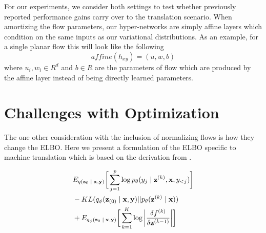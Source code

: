 For our experiments, we consider both settings to test whether previously reported performance gains carry over to the translation scenario. When amortizing the flow parameters, our hyper-networks are simply affine layers which condition on the same inputs as our variational distributions. As an example, for a single planar flow this will look like the following 
\begin{equation}
	affine(h_{xy}) = (u, w, b)
\end{equation}
where $u_{i}, w_{i} \in R^{d}$ and $b \in R$ are the parameters of flow which are produced by the affine layer instead of being directly learned parameters.









\section{Challenges with Optimization}

The one other consideration with the inclusion of normalizing flows is how they change the \ac{ELBO}. Here we present a formulation of the \ac{ELBO} specific to machine translation which is based on the derivation from \citealp[Section 4.2]{rezende2015VIwithNF}.

\begin{align}
\begin{split}\label{eq:2}
&
E_{q(\textbf{z}_{0}\; | \;{\textbf{x}, \textbf{y}})} \bigg[ \sum_{j=1}^{p} \log p_{\theta}(y_{j} \; | \;{\textbf{z}^{(k)}}, \textbf{x}, y_{<j}) \bigg] \\
& - KL(q_{\phi}(\textbf{z}_{(0)} \; | \;{\textbf{x}, \textbf{y}}) || p_{\theta}(\textbf{z}^{(k)} \; | \;{\textbf{x}})) \\
&   +  E_{q_{\phi}(\textbf{z}_{0} \; | \;{\textbf{x}, \textbf{y}})} \bigg[\sum_{k=1}^{K} \log \bigg|\frac{\delta f^{(k)}}{\delta \textbf{z}^{(k-1)}} \bigg| \bigg]  
\end{split}
\end{align}

